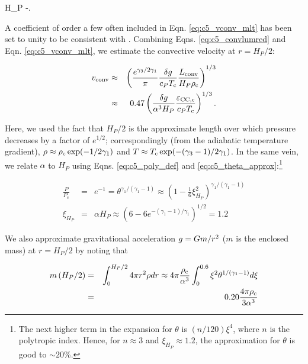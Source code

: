 \eqbegin
H_P \equiv -.
\label{eq:c5_scaleheight}
\eqend

\noindent A coefficient of order a few often included in Eqn. \ref{eq:c5_vconv_mlt} has been set to unity to be consistent with \citeal{piroc08}.  Combining Eqns. \ref{eq:c5_convlumred} and Eqn. \ref{eq:c5_vconv_mlt}, we estimate the convective velocity at $r = H_P/2$:

\begin{eqnarray}
\vconv &\approx& \left(\frac{e^{\gamma_3/2\gamma_1}}{\pi}\frac{\delta \gacc}{c_P \Tc}\frac{\Lconv}{H_P \rhoc}\right)^{1/3} \nonumber \\
	&\approx& 0.47\left(\frac{\delta \gacc}{\alpha^3H_P}\frac{\epscentral}{c_P \Tc}\right)^{1/3}.
\label{eq:c5_vconvest}
\end{eqnarray}


\noindent Here, we used the fact that $H_P/2$ is the approximate length over which pressure decreases by a factor of $e^{1/2}$; correspondingly (from the adiabatic temperature gradient), $\rho \approx \rhoc\exp(-1/2\gamma_1)$ and $T \approx \Tc\exp(-(\gamma_3 - 1)/2\gamma_1)$.  In the same vein, we relate $\alpha$ to $H_P$ using Eqns. \ref{eq:c5_poly_def} and \ref{eq:c5_theta_approx}:\footnote{The next higher term in the expansion for $\theta$ is $(n/120)\xi^4$, where $n$ is the polytropic index.  Hence, for $n \approx 3$ and $\xi_{H_P} \approx 1.2$, the approximation for $\theta$ is good to $\sim20$\%.}

\begin{eqnarray}
\frac{P}{P_\mathrm{c}} &=& e^{-1} = \theta^{\gamma_1/(\gamma_1 - 1)} \approx \left(1 - \frac{1}{6}\xi_{H_P}^2\right)^{\gamma_1/(\gamma_1 - 1)}  \nonumber \\
\xi_{H_P} &=& \alpha H_P \approx \left(6 - 6e^{-(\gamma_1 - 1)/\gamma_1}\right)^{1/2} = 1.2
\label{eq:c5_poly_xihp2}
\end{eqnarray}

\noindent We also approximate gravitational acceleration $\gacc = Gm/r^2$ ($m$ is the enclosed mass) at $r = H_P/2$ by noting that

\begin{eqnarray}
m\left(H_P/2\right) &=& \int_0^{H_P/2} 4\pi r^2\rho dr \approx 4\pi\frac{\rhoc}{\alpha^3}\int_0^{0.6}\xi^2\theta^{1/(\gamma_1 - 1)}d\xi \nonumber \\
&=& 0.20\frac{4\pi\rhoc}{3\alpha^3} 
\label{eq:c5_poly_mhp2}
\end{eqnarray}

